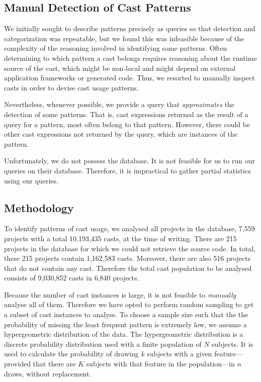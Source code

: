 \subsection*{Manual Detection of Cast Patterns}

We initially sought to describe patterns precisely as \ql{} queries so that
detection and categorization was repeatable,
but we found this was infeasible because of the
complexity of the reasoning involved in identifying some patterns.
Often determining to which pattern a cast belongs requires reasoning about the runtime source of the cast,
which might be non-local and might depend on external application frameworks or generated code.
Thus, we resorted to manually inspect casts in order to devise cast usage patterns.

Nevertheless, whenever possible,
we provide a \ql{} query that \emph{approximates} the detection of some patterns.
That is, cast expressions returned as the result of a \ql{} query for a pattern,
most often belong to that pattern.
However, there could be other cast expressions not returned by the query,
which are instances of the pattern.

Unfortunately, we do not possess the \lgtm{} database.
It is not feasible for us to run our queries on their database.
Therefore, it is impractical to gather partial statistics using our queries.


\subsection*{Methodology}

To identify patterns of cast usage, we analysed all \java{} projects in the \lgtm{} database, 7,559 projects
with a total 10,193,435 casts, at the time of writing.
There are 215 projects in the database for which we could not retrieve the source code.
In total, these 215 projects contain 1,162,583 casts.
Moreover, there are also 516 projects that do not contain any cast.
Therefore the total cast population to be analysed consists of 9,030,852 casts in 6,840 projects.

Because the number of cast instances is large, it is not feasible to \emph{manually} analyse all of them.
Therefore we have opted to perform random sampling to get a subset of cast instances to analyse.
To choose a sample size such that the
the probability of missing the least frequent pattern is extremely low, we assume a
hypergeometric distribution of the data.
The hypergeometric distribution is a discrete probability distribution used with a finite population of $N$ subjects.
It is used to calculate the probability of drawing $k$ subjects with a given feature---provided that there are $K$ subjects with that feature in the population---in $n$ draws, without replacement.

